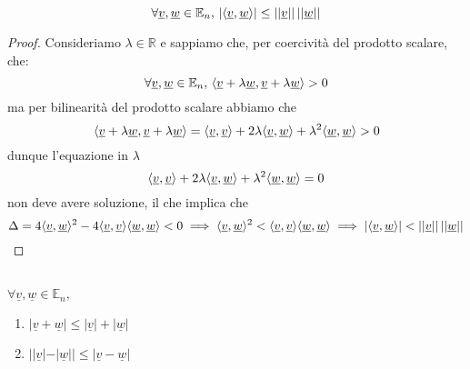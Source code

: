 \documentclass[openany]{book}
\begin{document}
\begin{prop}
$$\forall \underline{v}, \underline{w} \in \mathbb{E}_n, \, | \langle \underline{v}, \underline{w} \rangle | \leq ||\underline{v}|| \, ||\underline{w}||$$
\end{prop}
\begin{proof}
Consideriamo $\lambda \in \mathbb{R}$ e sappiamo che, per coercività del prodotto scalare, che:
$$
\forall \underline{v}, \underline{w} \in \mathbb{E}_n, \, \langle \underline{v} + \lambda \underline{w}, \underline{v} + \lambda \underline{w} \rangle > 0
$$
ma per bilinearità del prodotto scalare abbiamo che
$$
\langle \underline{v} + \lambda \underline{w}, \underline{v} + \lambda \underline{w} \rangle = \langle \underline{v}, \underline{v} \rangle + 2\lambda \langle \underline{v}, \underline{w} \rangle + \lambda^2 \langle \underline{w}, \underline{w} \rangle> 0
$$
dunque l'equazione in $\lambda$
$$
\langle \underline{v}, \underline{v} \rangle + 2\lambda \langle \underline{v}, \underline{w} \rangle + \lambda^2 \langle \underline{w}, \underline{w} \rangle = 0
$$
non deve avere soluzione, il che implica che
$$
\Delta = 4\langle \underline{v}, \underline{w} \rangle^2 - 4 \langle \underline{v}, \underline{v} \rangle \langle \underline{w}, \underline{w} \rangle < 0 \implies \langle \underline{v}, \underline{w} \rangle^2 < \langle \underline{v}, \underline{v} \rangle \langle \underline{w}, \underline{w} \rangle \implies |\langle \underline{v}, \underline{w} \rangle| < ||\underline{v}|| \, ||\underline{w}||
$$
\end{proof}
\begin{prop} \hfill \\
$ \forall \underline{v}, \underline{w} \in \mathbb{E}_n, $
\begin{enumerate}[label=\protect\circled{\arabic*}]
	\item $|\underline{v} + \underline{w}| \leq |\underline{v}| + |\underline{w}|$
	\item $||\underline{v}| - |\underline{w}|| \leq |\underline{v} - \underline{w}|$
\end{enumerate}
\label{prop:dis_triang}
\end{prop}
\end{document}
